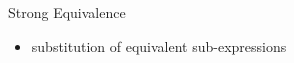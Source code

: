 \begin{frame}{Strong Equivalence}
  \begin{itemize}
  \item substitution of equivalent sub-expressions
  \end{itemize}
\end{frame}
